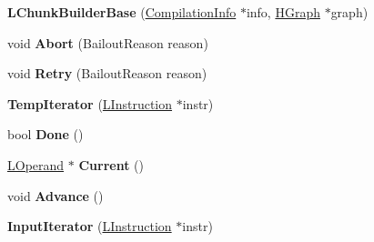 \begin{DoxyCompactItemize}
\item 
{\bfseries L\+Chunk\+Builder\+Base} (\hyperlink{classv8_1_1internal_1_1_compilation_info}{Compilation\+Info} $\ast$info, \hyperlink{classv8_1_1internal_1_1_h_graph}{H\+Graph} $\ast$graph)\hypertarget{classv8_1_1internal_1_1_b_a_s_e___e_m_b_e_d_d_e_d_a14e7b06036b8b5002b2d6249dc8540c6}{}\label{classv8_1_1internal_1_1_b_a_s_e___e_m_b_e_d_d_e_d_a14e7b06036b8b5002b2d6249dc8540c6}

\item 
void {\bfseries Abort} (Bailout\+Reason reason)\hypertarget{classv8_1_1internal_1_1_b_a_s_e___e_m_b_e_d_d_e_d_ae06ab65769fc7aa8bbfb029a8457af66}{}\label{classv8_1_1internal_1_1_b_a_s_e___e_m_b_e_d_d_e_d_ae06ab65769fc7aa8bbfb029a8457af66}

\item 
void {\bfseries Retry} (Bailout\+Reason reason)\hypertarget{classv8_1_1internal_1_1_b_a_s_e___e_m_b_e_d_d_e_d_a020bd9e352dd28cd3e29ca3f9c04a1d9}{}\label{classv8_1_1internal_1_1_b_a_s_e___e_m_b_e_d_d_e_d_a020bd9e352dd28cd3e29ca3f9c04a1d9}

\item 
{\bfseries Temp\+Iterator} (\hyperlink{classv8_1_1internal_1_1_l_instruction}{L\+Instruction} $\ast$instr)\hypertarget{classv8_1_1internal_1_1_b_a_s_e___e_m_b_e_d_d_e_d_a2452385fc64e5b241bad4db9fd3e3a4d}{}\label{classv8_1_1internal_1_1_b_a_s_e___e_m_b_e_d_d_e_d_a2452385fc64e5b241bad4db9fd3e3a4d}

\item 
bool {\bfseries Done} ()\hypertarget{classv8_1_1internal_1_1_b_a_s_e___e_m_b_e_d_d_e_d_a6751c90815f98147a0742d7974e68eae}{}\label{classv8_1_1internal_1_1_b_a_s_e___e_m_b_e_d_d_e_d_a6751c90815f98147a0742d7974e68eae}

\item 
\hyperlink{classv8_1_1internal_1_1_l_operand}{L\+Operand} $\ast$ {\bfseries Current} ()\hypertarget{classv8_1_1internal_1_1_b_a_s_e___e_m_b_e_d_d_e_d_a0b36f9bbdd7bed02b2f2e3e3be6cfd02}{}\label{classv8_1_1internal_1_1_b_a_s_e___e_m_b_e_d_d_e_d_a0b36f9bbdd7bed02b2f2e3e3be6cfd02}

\item 
void {\bfseries Advance} ()\hypertarget{classv8_1_1internal_1_1_b_a_s_e___e_m_b_e_d_d_e_d_a3d99e222f406f37deb9382e9e370b68a}{}\label{classv8_1_1internal_1_1_b_a_s_e___e_m_b_e_d_d_e_d_a3d99e222f406f37deb9382e9e370b68a}

\item 
{\bfseries Input\+Iterator} (\hyperlink{classv8_1_1internal_1_1_l_instruction}{L\+Instruction} $\ast$instr)\hypertarget{classv8_1_1internal_1_1_b_a_s_e___e_m_b_e_d_d_e_d_aa48169918dea47af48c589ded36dbac2}{}\label{classv8_1_1internal_1_1_b_a_s_e___e_m_b_e_d_d_e_d_aa48169918dea47af48c589ded36dbac2}


\end{DoxyCompactItemize}
